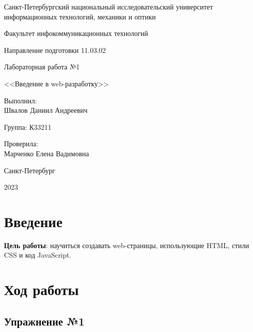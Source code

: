 \documentclass[a4paper, 14pt]{extarticle}
\begin{document}
\begin{titlepage}
  \vspace{0pt plus2fill}
  \noindent

  \vspace{0pt plus6fill}
  \begin{center}
    Санкт-Петербургский национальный исследовательский университет
    информационных технологий, механики и оптики

    \vspace{0pt plus3fill}

    Факультет инфокоммуникационных технологий

    Направление подготовки 11.03.02

    \vspace{0pt plus2fill}

    Лабораторная работа №1

    <<Введение в web-разработку>>

  \end{center}

  \vspace{0pt plus9fill}
  \begin{flushright}
    Выполнил: \\
    Швалов Даниил Андреевич

    Группа: К33211

    Проверила: \\
    Марченко Елена Вадимовна
  \end{flushright}

  \vspace{0pt plus2fill}
  \begin{center}
    Санкт-Петербург

    2023
  \end{center}
\end{titlepage}

\section{Введение}

\textbf{Цель работы}: научиться создавать web-страницы, использующие HTML,
стили CSS и код JavaScript.

\section{Ход работы}

\subsection{Упражнение №1}
\end{document}
